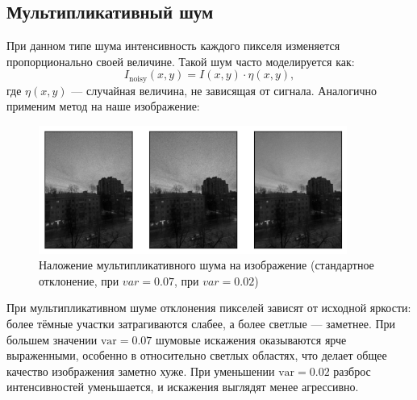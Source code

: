\documentclass[a4paper,12pt]{article}
\begin{document}
\subsection{Мультипликативный шум}
При данном типе шума интенсивность каждого пикселя изменяется пропорционально своей величине. Такой шум часто моделируется как:
\begin{equation*}
    I_{\text{noisy}}(x,y) = I(x,y) \cdot \eta(x,y),
\end{equation*}
где \(\eta(x,y)\) — случайная величина, не зависящая от сигнала.
Аналогично применим метод на наше изображение:
\begin{figure}[H]
    \centering \includegraphics[width=0.9\textwidth]{results/speckle_v.png}
    \caption{Наложение мультипликативного шума на изображение (стандартное отклонение, при $var=0.07$, при $var=0.02$)}
\end{figure}
\noindent
При мультипликативном шуме отклонения пикселей зависят от исходной яркости: более тёмные участки затрагиваются слабее, а более светлые — заметнее. При большем значении \(\text{var} = 0.07\) шумовые искажения оказываются ярче выраженными, особенно в относительно светлых областях, что делает общее качество изображения заметно хуже. При уменьшении \(\text{var} = 0.02\) разброс интенсивностей уменьшается, и искажения выглядят менее агрессивно.
\end{document}
